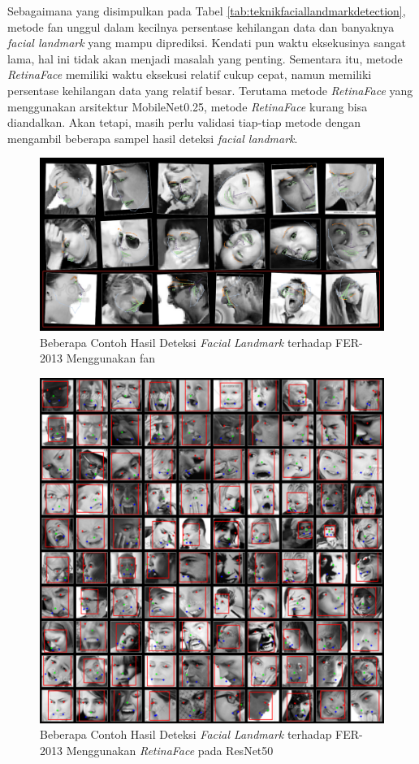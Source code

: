 Sebagaimana yang disimpulkan pada Tabel \ref{tab:teknikfaciallandmarkdetection}, metode \acrshort{fan} unggul dalam kecilnya persentase kehilangan data dan banyaknya \textit{facial landmark} yang mampu diprediksi. Kendati pun waktu eksekusinya sangat lama, hal ini tidak akan menjadi masalah yang penting. Sementara itu, metode \textit{RetinaFace} memiliki waktu eksekusi relatif cukup cepat, namun memiliki persentase kehilangan data yang relatif besar. Terutama metode \textit{RetinaFace} yang menggunakan arsitektur MobileNet0.25, metode \textit{RetinaFace} kurang bisa diandalkan. Akan tetapi, masih perlu validasi tiap-tiap metode dengan mengambil beberapa sampel hasil deteksi \textit{facial landmark}.

\begin{figure}
    \centering
    \includegraphics[width=14cm]{gambar/contoh_hasil_facealignment.png}
    \caption{Beberapa Contoh Hasil Deteksi \textit{Facial Landmark} terhadap FER-2013 Menggunakan \acrshort{fan}}
    \label{fig:contohhasilfacealignment}
\end{figure}
\begin{figure}
    \centering
    \includegraphics[width=14cm]{gambar/contoh_hasil_retinaface_score50.png}
    \caption{Beberapa Contoh Hasil Deteksi \textit{Facial Landmark} terhadap FER-2013 Menggunakan \textit{RetinaFace} pada ResNet50}
    \label{fig:contohhasilretinaface}
\end{figure}
